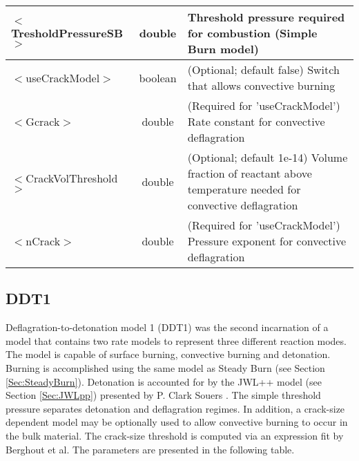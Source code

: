 \begin{center}
\begin{tabular}{| l | c | p{7cm} |}
\hline
  $<$TresholdPressureSB$>$ & double & Threshold pressure required for combustion (Simple Burn model) \\
\hline
  $<$useCrackModel$>$ & boolean & (Optional; default false) Switch that allows convective burning \\
\hline
  $<$Gcrack$>$ & double & (Required for 'useCrackModel') Rate constant for convective deflagration \\
\hline
  $<$CrackVolThreshold$>$ & double & (Optional; default 1e-14) Volume fraction of reactant above temperature needed for convective deflagration \\
\hline
  $<$nCrack$>$ & double & (Required for 'useCrackModel') Pressure exponent for convective deflagration \\
\hline
\end{tabular}
\end{center}



\newpage
\subsection{DDT1} \label {Sec:DDT1}

Deflagration-to-detonation model 1 (DDT1) \cite{ref:Peterson2012} was the second incarnation of a model
that contains two rate models to represent three different reaction modes. The
model is capable of surface burning, convective burning and detonation. Burning
is accomplished using the same model as Steady Burn (see Section \ref{Sec:SteadyBurn}).  Detonation
is accounted for by the JWL++ model (see Section \ref{Sec:JWLpp}) presented by P. Clark Souers  \cite{ref:JWL}.
The simple threshold pressure separates detonation and deflagration regimes.  In addition,
a crack-size dependent model may be optionally used to allow convective burning to
occur in the bulk material.  The crack-size threshold is computed via an expression fit by
Berghout et al. \cite{ref:Berghout2002}  The parameters are presented in the following table.

